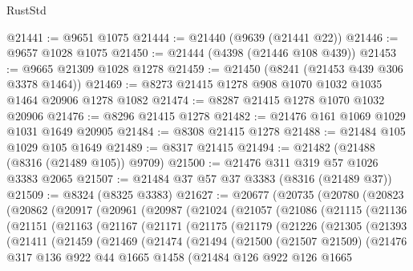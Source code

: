 \begin{lexlean}{RustStd}
\begin{coremodule}
@21441 := @9651 @1075
@21444 := @21440 (@9639 (@21441 @22))
@21446 := @9657 @1028 @1075
@21450 := @21444 (@4398 (@21446 @108 @439))
@21453 := @9665 @21309 @1028 @1278
@21459 := @21450 (@8241 (@21453 @439 @306 @3378 @1464))
@21469 := @8273 @21415 @1278 @908 @1070 @1032 @1035 @1464 @20906 @1278 @1082
@21474 := @8287 @21415 @1278 @1070 @1032 @20906
@21476 := @8296 @21415 @1278
@21482 := @21476 @161 @1069 @1029 @1031 @1649 @20905
@21484 := @8308 @21415 @1278
@21488 := @21484 @105 @1029 @105 @1649
@21489 := @8317 @21415
@21494 := @21482 (@21488 (@8316 (@21489 @105)) @9709)
@21500 := @21476 @311 @319 @57 @1026 @3383 @2065
@21507 := @21484 @37 @57 @37 @3383 (@8316 (@21489 @37))
@21509 := @8324 (@8325 @3383)
@21627 := @20677
    (@20735
      (@20780
        (@20823
          (@20862
            (@20917
              (@20961
                (@20987
                  (@21024
                    (@21057
                      (@21086
                        (@21115
                          (@21136
                            (@21151
                              (@21163
                                (@21167
                                  (@21171
                                    (@21175
                                      (@21179
                                        (@21226
                                          (@21305
                                            (@21393
                                              (@21411
                                                (@21459
                                                  (@21469
                                                    (@21474
                                                      (@21494
                                                        (@21500
                                                          (@21507 @21509)
                                                          (@21476
                                                            @317
                                                            @136
                                                            @922
                                                            @44
                                                            @1665
                                                            @1458
                                                            (@21484
                                                              @126
                                                              @922
                                                              @126
                                                              @1665

\end{coremodule}
\end{lexlean}
